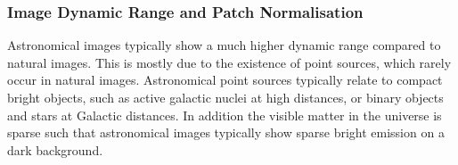 \documentclass[twocolumn]{aastex631}
\begin{document}
    



    

    \subsubsection{Image Dynamic Range and Patch Normalisation}
    Astronomical images typically show a much higher dynamic range compared to natural images. This is mostly due to the existence of point sources, which rarely occur in natural images. Astronomical point sources typically relate to compact bright objects, such as active galactic nuclei at high distances, or binary objects and stars at Galactic distances. In addition the visible matter in the universe is sparse such that astronomical images typically show sparse bright emission on a dark background. 
\end{document}
